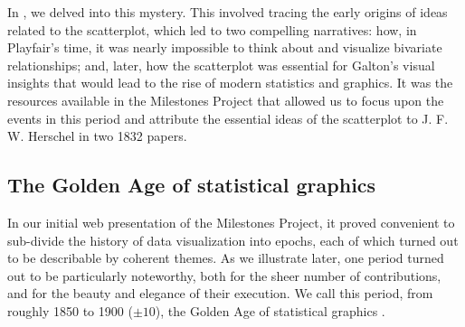 In \citet{FriendlyDenis:05:scat}, we delved into this mystery.  This involved tracing the early origins of ideas related to the scatterplot, which led to two compelling narratives: how, in Playfair's time, it was nearly impossible to think about and visualize bivariate relationships; and, later, how the scatterplot was essential for Galton's visual insights that would lead to the rise of modern statistics and graphics. It was the resources available in the Milestones Project that allowed us to focus upon the events in this period and attribute the essential ideas of the scatterplot to J. F. W. Herschel in two 1832 papers.

\subsection{The Golden Age of statistical graphics}

In our initial web presentation of the Milestones Project, it proved convenient
to sub-divide the history of data visualization into epochs, each of which turned
out to be describable by coherent themes.  As we illustrate later, one
period turned out to be particularly noteworthy, both for the sheer number of
contributions, and for the beauty and elegance of their execution. We call this period, from roughly 1850 to 1900 ($\pm 10$), the Golden Age of statistical graphics \citep{Friendly:2008:golden}.

